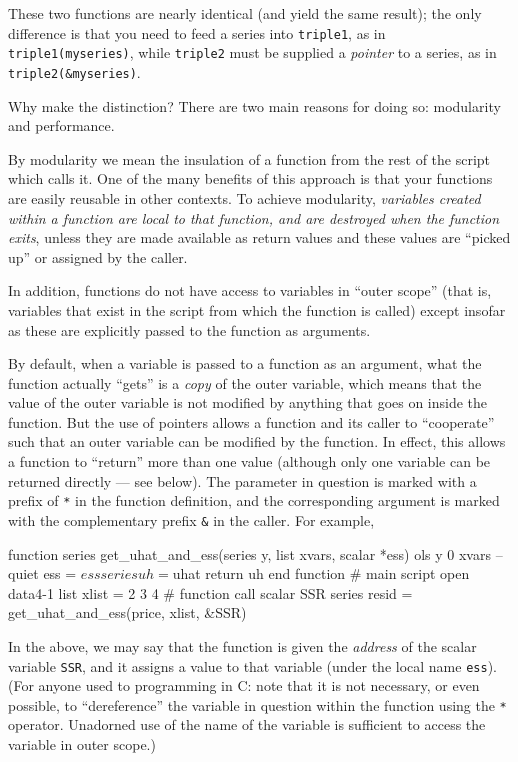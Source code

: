 These two functions are nearly identical (and yield the same result);
the only difference is that you need to feed a series into
\texttt{triple1}, as in \texttt{triple1(myseries)}, while
\texttt{triple2} must be supplied a \emph{pointer} to a series, as in
\texttt{triple2(\&myseries)}. 

Why make the distinction? There are two main reasons for doing so:
modularity and performance.

By modularity we mean the insulation of a function from the rest of
the script which calls it.  One of the many benefits of this approach
is that your functions are easily reusable in other contexts.  To
achieve modularity, \emph{variables created within a function are
  local to that function, and are destroyed when the function exits},
unless they are made available as return values and these values are
``picked up'' or assigned by the caller.
    
In addition, functions do not have access to variables in ``outer
scope'' (that is, variables that exist in the script from which the
function is called) except insofar as these are explicitly passed to
the function as arguments.

By default, when a variable is passed to a function as an argument,
what the function actually ``gets'' is a \emph{copy} of the outer
variable, which means that the value of the outer variable is not
modified by anything that goes on inside the function.  But the use of
pointers allows a function and its caller to ``cooperate'' such that
an outer variable can be modified by the function.  In effect, this
allows a function to ``return'' more than one value (although only one
variable can be returned directly --- see below).  The parameter in
question is marked with a prefix of \texttt{*} in the function
definition, and the corresponding argument is marked with the
complementary prefix \verb+&+ in the caller.  For example,
%
\begin{code}
function series get_uhat_and_ess(series y, list xvars, scalar *ess)
  ols y 0 xvars --quiet
  ess = $ess
  series uh = $uhat
  return uh
end function
# main script
open data4-1
list xlist = 2 3 4
# function call
scalar SSR
series resid = get_uhat_and_ess(price, xlist, &SSR)
\end{code}
%
In the above, we may say that the function is given the \emph{address}
of the scalar variable \texttt{SSR}, and it assigns a value to that
variable (under the local name \texttt{ess}).  (For anyone used to
programming in C: note that it is not necessary, or even possible, to
``dereference'' the variable in question within the function using the
\texttt{*} operator.  Unadorned use of the name of the variable is
sufficient to access the variable in outer scope.)

